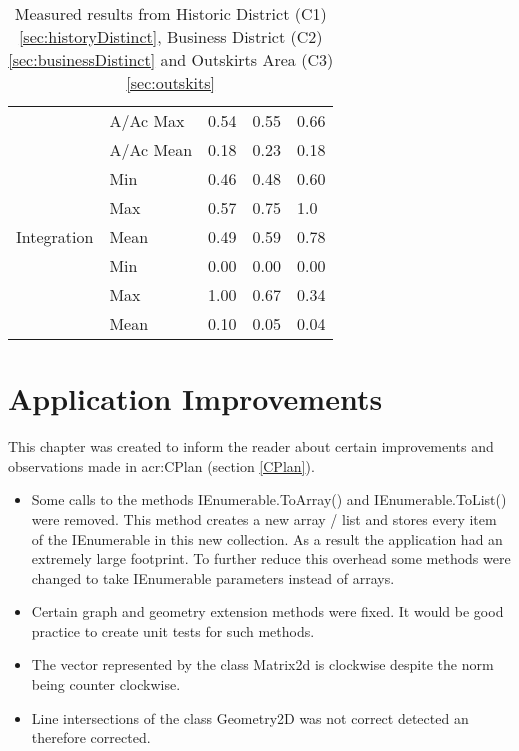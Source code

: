 \begin{table}[h]
\begin{center}
\begin{tabular}{ |l|l|l|l|l| }
            & A/Ac Max & 0.54 & 0.55 & 0.66 \\
            & A/Ac Mean & 0.18 & 0.23 & 0.18 \\
            \hline
            \multirow{5}{*}{Integration} 
            & Min & 0.46 & 0.48 & 0.60 \\
            & Max & 0.57 & 0.75 & 1.0 \\
            & Mean & 0.49 & 0.59 & 0.78 \\
            \hline
            \multirow{5}{*}{Choice}
            & Min & 0.00 & 0.00 & 0.00 \\
            & Max & 1.00 & 0.67 & 0.34 \\
            & Mean & 0.10 & 0.05 & 0.04 \\
            \hline
        \end{tabular}
        \caption{Measured results from Historic District (C1) \ref{sec:historyDistinct}, Business District (C2) \ref{sec:businessDistinct} and Outskirts Area (C3) \ref{sec:outskits}}
    \end{center}
\end{table}

\pagebreak
\section{Application Improvements}
This chapter was created to inform the reader about certain improvements and observations made in \gls{acr:CPlan} (section \ref{CPlan}).
\begin{itemize}
    \item Some calls to the methods IEnumerable.ToArray() and IEnumerable.ToList() were removed. This method creates a new array / list and stores every item of the IEnumerable in this new collection. As a result the application had an extremely large footprint. To further reduce this overhead some methods were changed to take IEnumerable parameters instead of arrays.
    \item Certain graph and geometry extension methods were fixed. It would be good practice to create unit tests for such methods.
    \item The vector represented by the class Matrix2d is clockwise despite the norm being counter clockwise.
    \item Line intersections of the class Geometry2D was not correct detected an therefore corrected.
\end{itemize}
